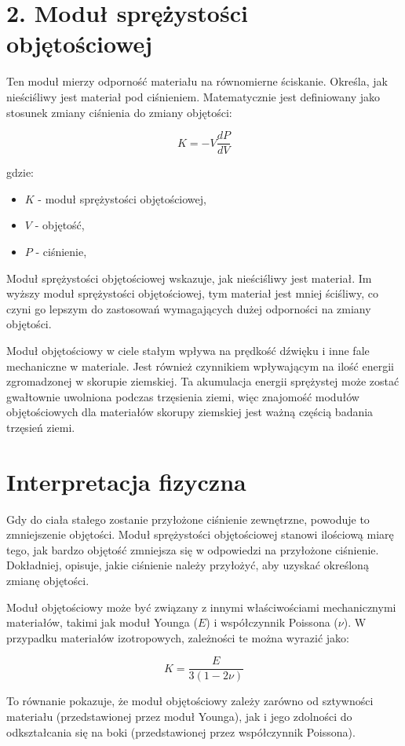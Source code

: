 {}
\justify
\fontsize{14}{16}\selectfont
\setlength{\parindent}{0pt}
\section*{2. Moduł sprężystości objętościowej \cite{alma991000389799708832, hyperphysics_url}} 
\fontsize{12}{14}\selectfont

Ten moduł mierzy odporność materiału na równomierne ściskanie. 
Określa, jak nieściśliwy jest materiał pod ciśnieniem. 
Matematycznie jest definiowany jako stosunek zmiany ciśnienia do zmiany objętości:

$$
K = -V \frac{dP}{dV}
$$

gdzie:
\begin{itemize}
    \item  $K$ - moduł sprężystości objętościowej,
    \item  $V$ - objętość,
    \item  $P$ - ciśnienie,
\end{itemize}

Moduł sprężystości objętościowej wskazuje, jak nieściśliwy jest materiał. Im wyższy moduł sprężystości objętościowej, tym materiał jest mniej ściśliwy, co czyni go lepszym do zastosowań wymagających dużej odporności na zmiany objętości.

Moduł objętościowy w ciele stałym wpływa na prędkość dźwięku i inne fale mechaniczne w materiale. Jest również czynnikiem wpływającym na ilość energii zgromadzonej w skorupie ziemskiej. Ta akumulacja energii sprężystej może zostać gwałtownie uwolniona podczas trzęsienia ziemi, więc znajomość modułów objętościowych dla materiałów skorupy ziemskiej jest ważną częścią badania trzęsień ziemi. 
{}
\section*{Interpretacja fizyczna \cite{alma991000386409708832}}
\vspace{-1.0em}
\label{sec:spacing_font_size}
Gdy do ciała stałego zostanie przyłożone ciśnienie zewnętrzne, powoduje to zmniejszenie objętości. Moduł sprężystości objętościowej stanowi ilościową miarę tego, jak bardzo objętość zmniejsza się w odpowiedzi na przyłożone ciśnienie. Dokładniej, opisuje, jakie ciśnienie należy przyłożyć, aby uzyskać określoną zmianę objętości.

Moduł objętościowy może być związany z innymi właściwościami mechanicznymi materiałów, takimi jak moduł Younga ($E$) i współczynnik Poissona ($\nu$). W przypadku materiałów izotropowych, zależności te można wyrazić jako:

$$
K = \frac{E}{3(1 - 2\nu)}
$$

To równanie pokazuje, że moduł objętościowy zależy zarówno od sztywności materiału (przedstawionej przez moduł Younga), jak i jego zdolności do odkształcania się na boki (przedstawionej przez współczynnik Poissona).

\clearpage